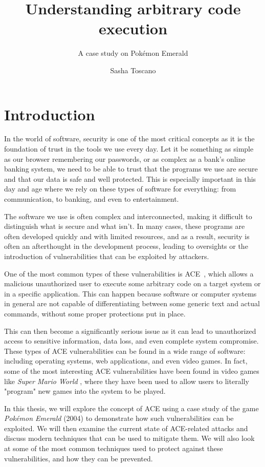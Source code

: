 \documentclass[a4paper]{usiinfbachelorproject}
\author{Sasha Toscano}
\title{\textbf{Understanding arbitrary code
execution}}
\subtitle{A case study on Pokémon Emerald}
\begin{document}
\maketitle
\tableofcontents\newpage

\section{Introduction}
In the world of software, security is one of the most critical concepts as it is the foundation of trust in the tools we use every day. Let it be something as simple as our browser remembering our passwords, or as complex as a bank's online banking system, we need to be able to trust that the programs we use are secure and that our data is safe and well protected. This is especially important in this day and age where we rely on these types of software for everything: from communication, to banking, and even to entertainment.

The software we use is often complex and interconnected, making it difficult to distinguish what is secure and what isn't. In many cases, these programs are often developed quickly and with limited resources, and as a result, security is often an afterthought in the development process, leading to oversights or the introduction of vulnerabilities that can be exploited by attackers.

One of the most common types of these vulnerabilities is ACE~\cite{websrc1}, which allows a malicious unauthorized user to execute some arbitrary code on a target system or in a specific application. This can happen because software or computer systems in general are not capable of differentiating between some generic text and actual commands, without some proper protections put in place.

This can then become a significantly serious issue as it can lead to unauthorized access to sensitive information, data loss, and even complete system compromise. These types of ACE vulnerabilities can be found in a wide range of software: including operating systems, web applications, and even video games. In fact, some of the most interesting ACE vulnerabilities have been found in video games like \textit{Super Mario World} \cite{smw-ace}, where they have been used to allow users to literally "program" new games into the system to be played.

In this thesis, we will explore the concept of ACE using a case study of the game \textit{Pokémon Emerald} (2004) to demonstrate how such vulnerabilities can be exploited. We will then examine the current state of ACE-related attacks and discuss modern techniques that can be used to mitigate them. We will also look at some of the most common techniques used to protect against these vulnerabilities, and how they can be prevented.
\end{document}
